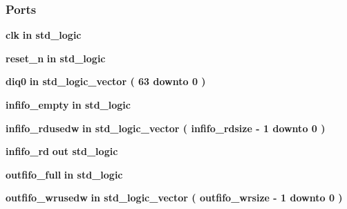 \subsubsection*{Ports}
 \begin{DoxyCompactItemize}
\item 
{\bf clk}  {\bfseries {\bfseries \textcolor{keywordflow}{in}\textcolor{vhdlchar}{ }}} {\bfseries \textcolor{comment}{std\+\_\+logic}\textcolor{vhdlchar}{ }} 
\item 
{\bf reset\+\_\+n}  {\bfseries {\bfseries \textcolor{keywordflow}{in}\textcolor{vhdlchar}{ }}} {\bfseries \textcolor{comment}{std\+\_\+logic}\textcolor{vhdlchar}{ }} 
\item 
{\bf diq0}  {\bfseries {\bfseries \textcolor{keywordflow}{in}\textcolor{vhdlchar}{ }}} {\bfseries \textcolor{comment}{std\+\_\+logic\+\_\+vector}\textcolor{vhdlchar}{ }\textcolor{vhdlchar}{(}\textcolor{vhdlchar}{ }\textcolor{vhdlchar}{ } \textcolor{vhdldigit}{63} \textcolor{vhdlchar}{ }\textcolor{keywordflow}{downto}\textcolor{vhdlchar}{ }\textcolor{vhdlchar}{ } \textcolor{vhdldigit}{0} \textcolor{vhdlchar}{ }\textcolor{vhdlchar}{)}\textcolor{vhdlchar}{ }} 
\item 
{\bf infifo\+\_\+empty}  {\bfseries {\bfseries \textcolor{keywordflow}{in}\textcolor{vhdlchar}{ }}} {\bfseries \textcolor{comment}{std\+\_\+logic}\textcolor{vhdlchar}{ }} 
\item 
{\bf infifo\+\_\+rdusedw}  {\bfseries {\bfseries \textcolor{keywordflow}{in}\textcolor{vhdlchar}{ }}} {\bfseries \textcolor{comment}{std\+\_\+logic\+\_\+vector}\textcolor{vhdlchar}{ }\textcolor{vhdlchar}{(}\textcolor{vhdlchar}{ }\textcolor{vhdlchar}{ }\textcolor{vhdlchar}{ }\textcolor{vhdlchar}{ }{\bfseries {\bf infifo\+\_\+rdsize}} \textcolor{vhdlchar}{-\/}\textcolor{vhdlchar}{ } \textcolor{vhdldigit}{1} \textcolor{vhdlchar}{ }\textcolor{keywordflow}{downto}\textcolor{vhdlchar}{ }\textcolor{vhdlchar}{ } \textcolor{vhdldigit}{0} \textcolor{vhdlchar}{ }\textcolor{vhdlchar}{)}\textcolor{vhdlchar}{ }} 
\item 
{\bf infifo\+\_\+rd}  {\bfseries {\bfseries \textcolor{keywordflow}{out}\textcolor{vhdlchar}{ }}} {\bfseries \textcolor{comment}{std\+\_\+logic}\textcolor{vhdlchar}{ }} 
\item 
{\bf outfifo\+\_\+full}  {\bfseries {\bfseries \textcolor{keywordflow}{in}\textcolor{vhdlchar}{ }}} {\bfseries \textcolor{comment}{std\+\_\+logic}\textcolor{vhdlchar}{ }} 
\item 
{\bf outfifo\+\_\+wrusedw}  {\bfseries {\bfseries \textcolor{keywordflow}{in}\textcolor{vhdlchar}{ }}} {\bfseries \textcolor{comment}{std\+\_\+logic\+\_\+vector}\textcolor{vhdlchar}{ }\textcolor{vhdlchar}{(}\textcolor{vhdlchar}{ }\textcolor{vhdlchar}{ }\textcolor{vhdlchar}{ }\textcolor{vhdlchar}{ }{\bfseries {\bf outfifo\+\_\+wrsize}} \textcolor{vhdlchar}{-\/}\textcolor{vhdlchar}{ } \textcolor{vhdldigit}{1} \textcolor{vhdlchar}{ }\textcolor{keywordflow}{downto}\textcolor{vhdlchar}{ }\textcolor{vhdlchar}{ } \textcolor{vhdldigit}{0} \textcolor{vhdlchar}{ }\textcolor{vhdlchar}{)}\textcolor{vhdlchar}{ }} 

\end{DoxyCompactItemize}
